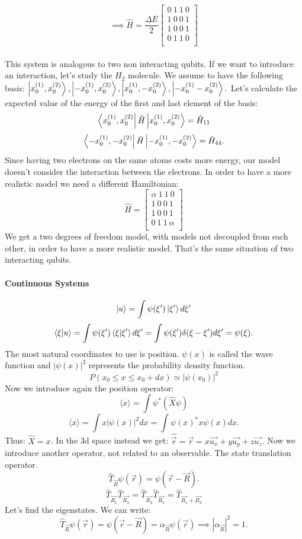 \documentclass{article}
\begin{document}
$$\implies \hat{H} = \frac{\Delta E}{2} \begin{bmatrix}
    0 \ 1 \ 1 \ 0 \\
    1 \ 0 \ 0 \ 1 \\
    1 \ 0 \ 0 \ 1 \\
    0 \ 1 \ 1 \ 0 \\ 
\end{bmatrix}$$
\\
This system is analogous to two non interacting qubits.
If we want to introduce an interaction, let's study the $H_{2}$ molecule. We assume to have the following basis:
$\ket{x_0^{(1)},x_0^{(2)}},\ket{-x_0^{(1)},x_0^{(2)}},\ket{x_0^{(1)}, -x_0^{(2)}}, \ket{-x_0^{(1)} -x_0^{(2)}}.$
Let's calculate the expected value of the energy of the first and last element of the basis:
$$\bra{x_0^{(1)},x_0^{(2)}} \hat{H} \ket{x_0^{(1)},x_0^{(2)}} = \hat{H}_{11}$$
$$\bra{-x_0^{(1)},-x_0^{(2)}} \hat{H} \ket{-x_0^{(1)},-x_0^{(2)}} = \hat{H}_{44}.$$
Since having  two electrons on the same atoms costs more energy, our model doesn't consider the interaction between the electrons.
In order to have a more realistic model we need a different Hamiltonian:
$$ \hat{H} =  \begin{bmatrix}
    \alpha \ 1 \ 1 \ 0 \\
    1 \ 0 \ 0 \ 1 \\
    1 \ 0 \ 0 \ 1 \\
    0 \ 1 \ 1 \ \alpha \\ 
\end{bmatrix} $$
We get a two degrees of freedom model, with models not decoupled from each other, in order to have a more realistic model. That's the same situation of two interacting qubits.
\paragraph{Continuous Systems}

$$\ket{u} = \int \psi(\xi') \ket{\xi'} d\xi'$$
$$\bra{\xi}\ket{u} = \int \psi (\xi') \bra{\xi}\ket{\xi'}d\xi' = \int \psi (\xi') \delta(\xi -\xi') d\xi' =\psi(\xi).$$
The most natural coordinates to use is position. $\psi(x)$ is called the wave function and
$|\psi(x)|^2$ represents the probability density function.
$$P(x_0 \leq x \leq x_0 + dx) \simeq | \psi(x_0) |^2$$
Now we introduce again the position operator:
$$\langle x \rangle = \int \psi^* ( \hat{X} \psi)$$
$$ \langle x \rangle  = \int x | \psi(x) | ^2 dx = \int \psi(x)^* x \psi(x) dx.$$
Thus: $\hat{X} = x$. In the 3d space instead we get: $ \hat{\vec{r}} = \vec{r} = x \vec{u_x} + y \vec{u_y} + z \vec{u_z}. $
Now we introduce another operator, not related to an observable. The state translation operator.
$$\hat{T}_{\vec{R}} \psi(\vec{r}) = \psi(\vec{r}-\vec{R}).$$
$$\hat{T}_{\vec{R_1}}\hat{T}_{\vec{R_2}} = \hat{T}_{\vec{R_2}}\hat{T}_{\vec{R_1}} = \hat{T}_{\vec{R_1}+ \vec{R_2}}$$
Let's find the eigenstates. We can write:
$$\hat{T}_{\vec{R}} \psi(\vec{r}) = \psi(\vec{r}-\vec{R}) = \alpha_{\vec{R}} \psi(\vec{r}) \implies |\alpha_{\vec{R}}|^2 = 1.$$
\end{document}
